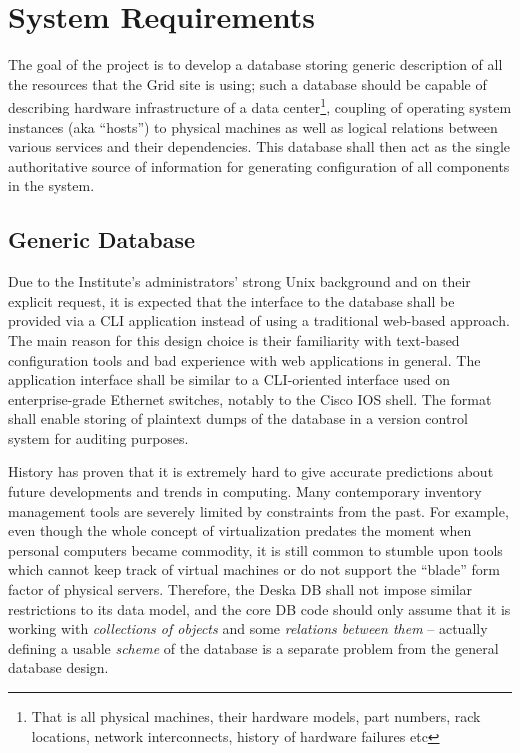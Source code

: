 \documentclass{article}
\begin{document}
\section{System Requirements}

The goal of the project is to develop a database storing generic description of all the resources that the Grid
site is using; such a database should be capable of describing hardware infrastructure of a data center\footnote{That is all
physical machines, their hardware models, part numbers, rack locations, network interconnects, history of hardware failures etc},
coupling of operating system instances (aka ``hosts'') to physical machines as well as logical relations between various
services and their dependencies.  This database shall then act as the single authoritative source of information for generating
configuration of all components in the system.

\subsection{Generic Database}

Due to the Institute's administrators' strong Unix background and on their explicit request, it is expected that the interface to
the database shall be provided via a CLI application instead of using a traditional web-based approach.  The main reason for this
design choice is their familiarity with text-based configuration tools and bad experience with web applications in general.  The
application interface shall be similar to a CLI-oriented interface used on enterprise-grade Ethernet switches, notably to the
Cisco IOS shell.  The format shall enable storing of plaintext dumps of the database in a version control system for auditing
purposes.

History has proven that it is extremely hard to give accurate predictions about future developments and trends in computing.  Many
contemporary inventory management tools are severely limited by constraints from the past.  For example, even though the whole concept of
virtualization predates the moment when personal computers became commodity, it is still common to stumble upon tools which cannot
keep track of virtual machines or do not support the ``blade'' form factor of physical servers.  Therefore, the Deska DB shall not
impose similar restrictions to its data model, and the core DB code should only assume that it is working with {\em collections of
objects} and some {\em relations between them} -- actually defining a usable {\em scheme} of the database is a separate problem
from the general database design.
\end{document}
